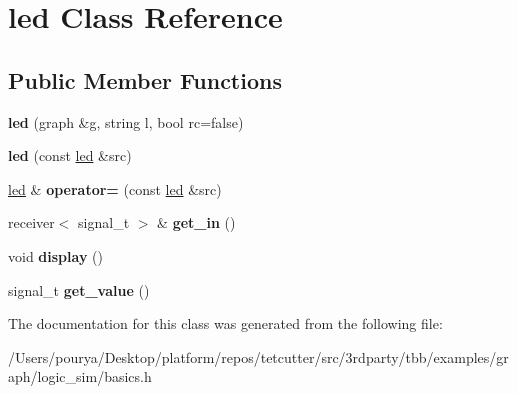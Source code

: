 \hypertarget{classled}{}\section{led Class Reference}
\label{classled}
\subsection*{Public Member Functions}
\begin{DoxyCompactItemize}
\item 
\hypertarget{classled_a6aa46a57a5d0469e07f883ce6ff52578}{}{\bfseries led} (graph \&g, string l, bool rc=false)\label{classled_a6aa46a57a5d0469e07f883ce6ff52578}

\item 
\hypertarget{classled_a13d94c6cd6eb0e67a3792f4b4edcbabd}{}{\bfseries led} (const \hyperlink{classled}{led} \&src)\label{classled_a13d94c6cd6eb0e67a3792f4b4edcbabd}

\item 
\hypertarget{classled_a391d3414cbf622c6f3f3dffc67dea829}{}\hyperlink{classled}{led} \& {\bfseries operator=} (const \hyperlink{classled}{led} \&src)\label{classled_a391d3414cbf622c6f3f3dffc67dea829}

\item 
\hypertarget{classled_aa04813c7fca3d6d10ddcf106b703805d}{}receiver$<$ signal\+\_\+t $>$ \& {\bfseries get\+\_\+in} ()\label{classled_aa04813c7fca3d6d10ddcf106b703805d}

\item 
\hypertarget{classled_a7b955e3fadc66a028ae43c31e3454620}{}void {\bfseries display} ()\label{classled_a7b955e3fadc66a028ae43c31e3454620}

\item 
\hypertarget{classled_a9be14b429ee7201798032bd0251066a8}{}signal\+\_\+t {\bfseries get\+\_\+value} ()\label{classled_a9be14b429ee7201798032bd0251066a8}

\end{DoxyCompactItemize}


The documentation for this class was generated from the following file\+:\begin{DoxyCompactItemize}
\item 
/\+Users/pourya/\+Desktop/platform/repos/tetcutter/src/3rdparty/tbb/examples/graph/logic\+\_\+sim/basics.\+h\end{DoxyCompactItemize}
